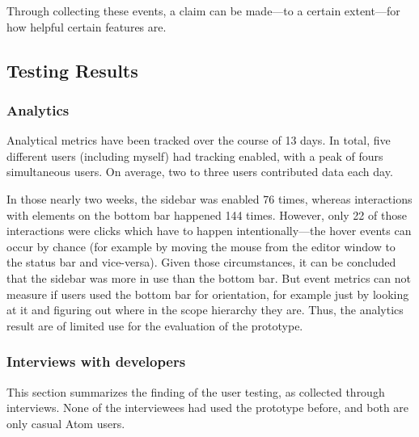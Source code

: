 Through collecting these events, a claim can be made—to a certain
extent—for how helpful certain features are.

\subsection{Testing Results}\label{testing-results}

\subsubsection{Analytics}\label{analytics}

Analytical metrics have been tracked over the course of 13 days. In
total, five different users (including myself) had tracking enabled,
with a peak of fours simultaneous users. On average, two to three users
contributed data each day.

In those nearly two weeks, the sidebar was enabled 76 times, whereas
interactions with elements on the bottom bar happened 144 times.
However, only 22 of those interactions were clicks which have to happen
intentionally—the hover events can occur by chance (for example by
moving the mouse from the editor window to the status bar and
vice-versa). Given those circumstances, it can be concluded that the
sidebar was more in use than the bottom bar. But event metrics can not
measure if users used the bottom bar for orientation, for example just
by looking at it and figuring out where in the scope hierarchy they are.
Thus, the analytics result are of limited use for the evaluation of the
prototype.

\subsubsection{Interviews with
developers}\label{interviews-with-developers}

This section summarizes the finding of the user testing, as collected
through interviews. None of the interviewees had used the prototype
before, and both are only casual Atom users.

